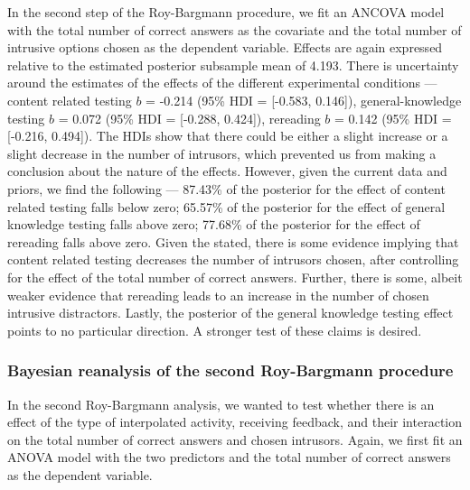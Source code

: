 \documentclass[../main.tex]{subfiles}
\begin{document}
In the second step of the Roy-Bargmann procedure, we fit an ANCOVA model
with the total number of correct answers as the covariate and the total
number of intrusive options chosen as the dependent variable. Effects
are again expressed relative to the estimated posterior subsample mean
of 4.193. There is uncertainty around the estimates of the effects of
the different experimental conditions --- content related testing \(b\)
= -0.214 (95\% HDI = {[}-0.583, 0.146{]}), general-knowledge testing
\(b\) = 0.072 (95\% HDI = {[}-0.288, 0.424{]}), rereading \(b\) = 0.142
(95\% HDI = {[}-0.216, 0.494{]}). The HDIs show that there could be
either a slight increase or a slight decrease in the number of
intrusors, which prevented us from making a conclusion about the nature
of the effects. However, given the current data and priors, we find the
following --- 87.43\% of the posterior for the effect of content related
testing falls below zero; 65.57\% of the posterior for the effect of
general knowledge testing falls above zero; 77.68\% of the posterior for
the effect of rereading falls above zero. Given the stated, there is
some evidence implying that content related testing decreases the number
of intrusors chosen, after controlling for the effect of the total
number of correct answers. Further, there is some, albeit weaker
evidence that rereading leads to an increase in the number of chosen
intrusive distractors. Lastly, the posterior of the general knowledge
testing effect points to no particular direction. A stronger test of
these claims is desired.

\hypertarget{bayesian-reanalysis-of-the-second-roy-bargmann-procedure}{%
\subsubsection{Bayesian reanalysis of the second Roy-Bargmann
procedure}\label{bayesian-reanalysis-of-the-second-roy-bargmann-procedure}}

In the second Roy-Bargmann analysis, we wanted to test whether there is
an effect of the type of interpolated activity, receiving feedback, and
their interaction on the total number of correct answers and chosen
intrusors. Again, we first fit an ANOVA model with the two predictors
and the total number of correct answers as the dependent variable.
\end{document}
